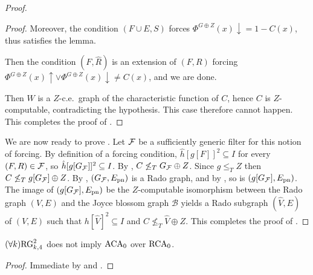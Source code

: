 \begin{proof}
\begin{proof}
Moreover, the condition $(F \cup E, S)$ forces $\Phi^{G \oplus Z}(x)\downarrow = 1-C(x)$, thus satisfies the lemma.

 Then the condition $(F, \hat{R})$ is an extension of $(F, R)$ forcing $\Phi^{G \oplus Z}(x)\uparrow \vee \Phi^{G \oplus Z}(x)\downarrow \neq C(x)$, and we are done.

 Then $W$ is a $Z$-c.e.\ graph of the characteristic function of $C$, hence $C$ is $Z$-computable, contradicting the hypothesis. This case therefore cannot happen. This completes the proof of .
\end{proof}


We are now ready to prove .
Let $\mathcal{F}$ be a sufficiently generic filter for this notion of forcing.
By definition of a forcing condition, $\hat{h}[g[F]]^2 \subseteq I$ for every $(F, R) \in \mathcal{F}$, so $\hat{h}[g[G_{\mathcal{F}}]]^2 \subseteq I$. By , $C \not \leq_T G_{\mathcal{F}} \oplus Z$. Since $g \leq_T Z$ then $C \not \leq_T g[G_{\mathcal{F}}] \oplus Z$. By , $(G_{\mathcal{F}}, E_{\mathrm{pn}})$ is a Rado graph, and by , so is $(g[G_{\mathcal{F}}], E_{\mathrm{pn}})$. 
The image of $(g[G_{\mathcal{F}}], E_{\mathrm{pn}})$ be the $Z$-computable isomorphism between the Rado graph $(V, E)$ and the Joyce blossom graph $\mathcal{B}$ yields a Rado subgraph $(\hat{V}, E)$ of $(V, E)$ such that $h[\hat{V}]^2 \subseteq I$ and $C \not \leq_T \hat{V} \oplus Z$.
This completes the proof of .
\end{proof}

\begin{corollary}
$(\forall k)\mathrm{RG}^2_{k, 4}$ does not imply $\mathrm{ACA}_0$ over $\mathrm{RCA}_0$.
\end{corollary}
\begin{proof}
Immediate by  and .
\end{proof}


